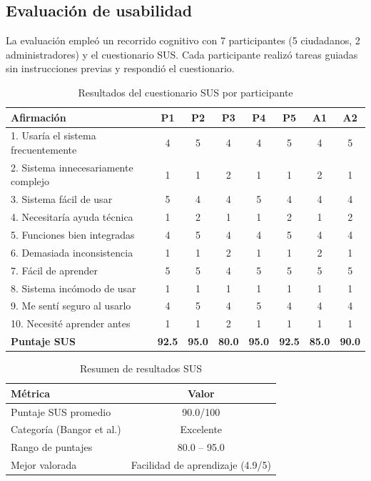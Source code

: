 \documentclass[12pt,letterpaper]{article}
\begin{document}
\subsection{Evaluación de usabilidad}

La evaluación empleó un recorrido cognitivo con 7 participantes (5 ciudadanos, 2 administradores) y el cuestionario SUS. Cada participante realizó tareas guiadas sin instrucciones previas y respondió el cuestionario.

\begin{table}[H]
\centering
\caption{Resultados del cuestionario SUS por participante}
\label{tab:usabilidad-sus}
\footnotesize
\begin{tabular}{lcccccc|c}
\hline
\textbf{Afirmación} & \textbf{P1} & \textbf{P2} & \textbf{P3} & \textbf{P4} & \textbf{P5} & \textbf{A1} & \textbf{A2} \\ \hline
1. Usaría el sistema frecuentemente & 4 & 5 & 4 & 4 & 5 & 4 & 5 \\
2. Sistema innecesariamente complejo & 1 & 1 & 2 & 1 & 1 & 2 & 1 \\
3. Sistema fácil de usar & 5 & 4 & 4 & 5 & 4 & 4 & 4 \\
4. Necesitaría ayuda técnica & 1 & 2 & 1 & 1 & 2 & 1 & 2 \\
5. Funciones bien integradas & 4 & 5 & 4 & 4 & 5 & 4 & 4 \\
6. Demasiada inconsistencia & 1 & 1 & 2 & 1 & 1 & 2 & 1 \\
7. Fácil de aprender & 5 & 5 & 4 & 5 & 5 & 5 & 5 \\
8. Sistema incómodo de usar & 1 & 1 & 1 & 1 & 1 & 1 & 1 \\
9. Me sentí seguro al usarlo & 4 & 5 & 4 & 5 & 4 & 4 & 4 \\
10. Necesité aprender antes & 1 & 1 & 2 & 1 & 1 & 1 & 1 \\ \hline
\textbf{Puntaje SUS} & \textbf{92.5} & \textbf{95.0} & \textbf{80.0} & \textbf{95.0} & \textbf{92.5} & \textbf{85.0} & \textbf{90.0} \\ \hline
\end{tabular}
\end{table}

\begin{table}[H]
\centering
\caption{Resumen de resultados SUS}
\label{tab:usabilidad-resumen}
\begin{tabular}{|l|c|}
\hline
\textbf{Métrica} & \textbf{Valor} \\ \hline
Puntaje SUS promedio & 90.0/100 \\ \hline
Categoría (Bangor et al.) & Excelente \\ \hline
Rango de puntajes & 80.0 -- 95.0 \\ \hline
Mejor valorada & Facilidad de aprendizaje (4.9/5) \\ \hline
\end{tabular}
\end{table}
\end{document}
